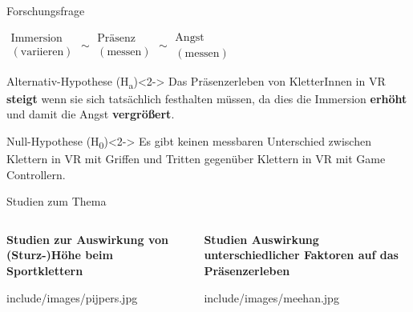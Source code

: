\begin{frame}{Forschungsfrage}
\begin{center}
	\LARGE
	$\substack{\text{Immersion}\\(\text{variieren})} \sim \substack{\text{Präsenz}\\(\text{messen})} \sim \substack{\text{Angst}\\(\text{messen})}$
\end{center}
\begin{center}
	\begin{minipage}{0.7\textwidth}
		\begin{block}{Alternativ-Hypothese (H\textsubscript{a}\label{hyp:anxiety})}<2->
			Das \textcolor{tertiary}{Präsenz}erleben von KletterInnen in \gls{VR} \textbf{steigt} wenn sie sich tatsächlich festhalten müssen, da dies die \textcolor{tertiary}{Immersion} \textbf{erhöht} und damit die \textcolor{tertiary}{Angst} \textbf{vergrößert}.
		\end{block}
		\begin{block}{Null-Hypothese (H\textsubscript{0}\label{hyp:anxiety})}<2->
			Es gibt keinen messbaren Unterschied zwischen Klettern in \gls{VR} mit \textcolor{tertiary}{Griffen und Tritten} gegenüber Klettern in \gls{VR} mit \textcolor{tertiary}{Game Controllern}.
		\end{block}
	\end{minipage}
\end{center}
\end{frame}

\begin{frame}{Studien zum Thema}
\begin{columns}
	\begin{column}{0.5\textwidth}
		\textbf{Studien zur Auswirkung von (Sturz-)Höhe beim Sportklettern}
		\autocites{Hardy2007}{Pijpers2006,Pijpers2005,Pijpers2003}
		\begin{center}
			\begin{overpic}[height=0.555\textheight]{include/images/pijpers.jpg}
			\end{overpic}
		\end{center}
	\end{column}
	\begin{column}{0.5\textwidth}
		\textbf{Studien Auswirkung unterschiedlicher Faktoren auf das Präsenzerleben}\\
		\autocite{Meehan2002,Meehan2001}
		\begin{center}
			\begin{overpic}[height=0.53\textheight]{include/images/meehan.jpg}
			\end{overpic}
		\end{center}
		\vfill
	\end{column}
\end{columns}
\end{frame}

